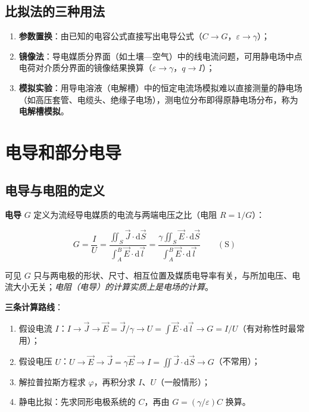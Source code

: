 \subsection{比拟法的三种用法}
\begin{enumerate}
  \item \textbf{参数置换}：由已知的电容公式直接写出电导公式（$C\to G$，$\varepsilon\to\gamma$）；
  \item \textbf{镜像法}：导电媒质分界面（如土壤—空气）中的线电流问题，可用静电场中点电荷对介质分界面的镜像结果换算（$\varepsilon\to\gamma$，$q\to I$）；
  \item \textbf{模拟实验}：用导电溶液（电解槽）中的恒定电流场模拟难以直接测量的静电场（如高压套管、电缆头、绝缘子电场），测电位分布即得原静电场分布，称为\textbf{电解槽模拟}。
\end{enumerate}


\section{电导和部分电导}

\subsection{电导与电阻的定义}
\textbf{电导} $G$ 定义为流经导电媒质的电流与两端电压之比（电阻 $R=1/G$）：
\begin{formulaBox}
\[
G=\frac{I}{U}
=\frac{\displaystyle\iint_S \vec{J}\cdot\mathrm{d}\vec{S}}
     {\displaystyle\int_A^B \vec{E}\cdot\mathrm{d}\vec{l}}
=\frac{\gamma\displaystyle\iint_S \vec{E}\cdot\mathrm{d}\vec{S}}
     {\displaystyle\int_A^B \vec{E}\cdot\mathrm{d}\vec{l}}
\qquad(\mathrm{S})
\]
\end{formulaBox}
可见 $G$ 只与两电极的形状、尺寸、相互位置及媒质电导率有关，与所加电压、电流大小无关；\emph{电阻（电导）的计算实质上是电场的计算}。

\textbf{三条计算路线}：
\begin{enumerate}
  \item 假设电流 $I$：$I\to\vec{J}\to\vec{E}=\vec{J}/\gamma\to U=\int\vec{E}\cdot\mathrm{d}\vec{l}\to G=I/U$（有对称性时最常用）；
  \item 假设电压 $U$：$U\to\vec{E}\to\vec{J}=\gamma\vec{E}\to I=\iint\vec{J}\cdot\mathrm{d}\vec{S}\to G$（不常用）；
  \item 解拉普拉斯方程求 $\varphi$，再积分求 $I$、$U$（一般情形）；
  \item 静电比拟：先求同形电极系统的 $C$，再由 $G=(\gamma/\varepsilon)C$ 换算。
\end{enumerate}

